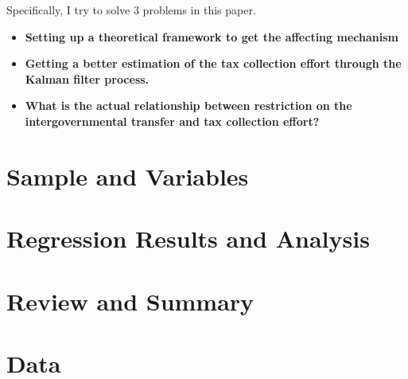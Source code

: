 \documentclass[man]{apa7}
\begin{document}
Specifically, I try to solve 3 problems in this paper.

\begin{itemize}
  \item \textbf{Setting up a theoretical framework to get the affecting mechanism}
\end{itemize}



\begin{itemize}
  \item \textbf{Getting a better estimation of the tax collection effort through the Kalman filter process.}
\end{itemize}


\begin{itemize}
  \item \textbf{What is the actual relationship between restriction on the intergovernmental transfer and tax collection effort?}
\end{itemize}

\section{Sample and Variables}



\section{Regression Results and Analysis}


\section{Review and Summary}



\printbibliography

\appendix
\section{Data}
\end{document}
